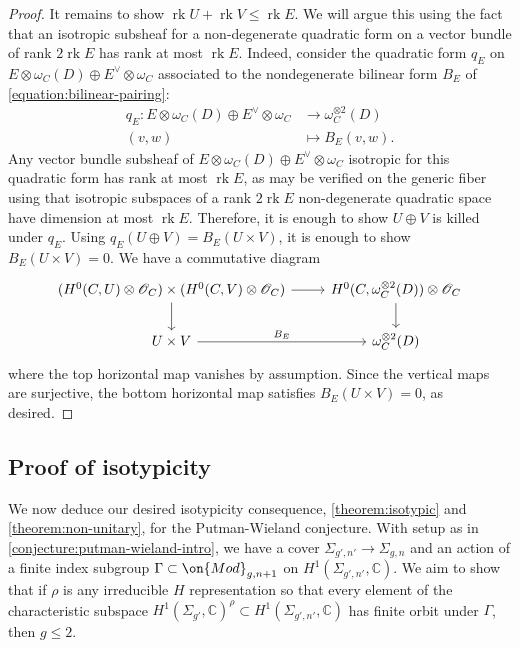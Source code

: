 \documentclass[12 pt]{amsart}
\theoremstyle{plain}
\theoremstyle{definition}
\theoremstyle{remark}
\numberwithin{equation}{section}
\DeclareMathOperator\rk{rk}
\begin{document}
\begin{proof}
It remains to show $\rk U + \rk V \leq \rk E$.
We will argue this using the fact that an isotropic subsheaf for a non-degenerate quadratic
form
on a vector bundle of rank $2\rk E$ has rank at most $\rk E$.
Indeed, consider the quadratic form $q_E$ on $E \otimes \omega_C(D) \oplus
E^\vee \otimes \omega_C$ associated to the nondegenerate bilinear form $B_E$ of
\eqref{equation:bilinear-pairing}:
\begin{align*}
	q_E : E \otimes \omega_C(D) \oplus
	E^\vee \otimes \omega_C &\to \omega_C^{\otimes 2}(D) \\
	(v,w) &\mapsto B_E(v,w).
\end{align*}
Any vector bundle subsheaf of $E \otimes \omega_C(D) \oplus E^\vee \otimes \omega_C$ 
isotropic for this quadratic form has rank at most $\rk E$, as may be verified
on the generic fiber using that isotropic subspaces of a rank $2 \rk E$
non-degenerate quadratic space have dimension at most $\rk E$.
Therefore, it is enough to
show $U \oplus V$ is killed under $q_E$.
Using $q_E(U \oplus V) = B_E(U \times V)$,
it is enough to show $B_E(U \times V) = 0$.
We have a commutative diagram
\begin{equation}
	\label{equation:}
	\begin{tikzcd} 
		(H^0(C, U) \otimes \mathscr O_C)\times  (H^0(C, V) \otimes \mathscr O_C) \ar {r} \ar {d}
		& H^0(C, \omega_C^{\otimes 2}(D)) \otimes \mathscr O_C \ar {d} \\
		U \times V \ar {r}{B_E} & \omega_C^{\otimes 2}(D)
\end{tikzcd}\end{equation}
where the top horizontal map vanishes by assumption.
Since the vertical maps are surjective, the bottom horizontal map satisfies $B_E(U \times
V) = 0$, as desired.
\end{proof}

\subsection{Proof of isotypicity}
\label{subsection:isotypic-proof}

We now deduce our desired isotypicity consequence, \autoref{theorem:isotypic} and \autoref{theorem:non-unitary}, 
for the Putman-Wieland conjecture.
With setup as in \autoref{conjecture:putman-wieland-intro},
we have a cover $\Sigma_{g',n'} \to \Sigma_{g,n}$ and 
an action of a finite index subgroup $\Gamma \subset \on{Mod}_{g,n+1}$
on $H^1(\Sigma_{g',n'}, \mathbb C)$. We aim to show that if $\rho$ is any
irreducible $H$ representation
so that every element of the
characteristic subspace
$H^1(\Sigma_{g'}, \mathbb C)^\rho \subset H^1(\Sigma_{g',n'}, \mathbb C)$ has
finite orbit under $\Gamma$,
then $g \leq 2$.
\end{document}
